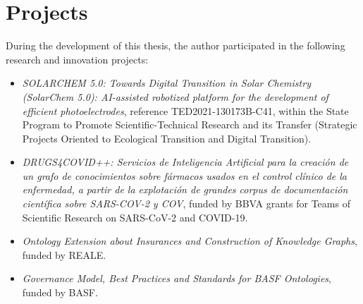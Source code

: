 \section{Projects}
During the development of this thesis, the author participated in the following research and innovation projects:

\begin{itemize}
    \item \textit{SOLARCHEM 5.0: Towards Digital Transition in Solar Chemistry (SolarChem 5.0): AI-assisted robotized platform for the development of efficient photoelectrodes}, reference TED2021-130173B-C41, within the State Program to Promote Scientific-Technical Research and its Transfer (Strategic Projects Oriented to Ecological Transition and Digital Transition).

    \item \textit{DRUGS4COVID++: Servicios de Inteligencia Artificial para la creación de un grafo de conocimientos sobre fármacos usados en el control clínico de la enfermedad, a partir de la explotación de grandes corpus de documentación científica sobre SARS-COV-2 y COV}, funded by BBVA grants for Teams of Scientific Research on SARS-CoV-2 and COVID-19.

    \item \textit{Ontology Extension about Insurances and Construction of Knowledge Graphs}, funded by REALE. 
    
    \item \textit{Governance Model, Best Practices and Standards for BASF Ontologies}, funded by BASF. 
\end{itemize}